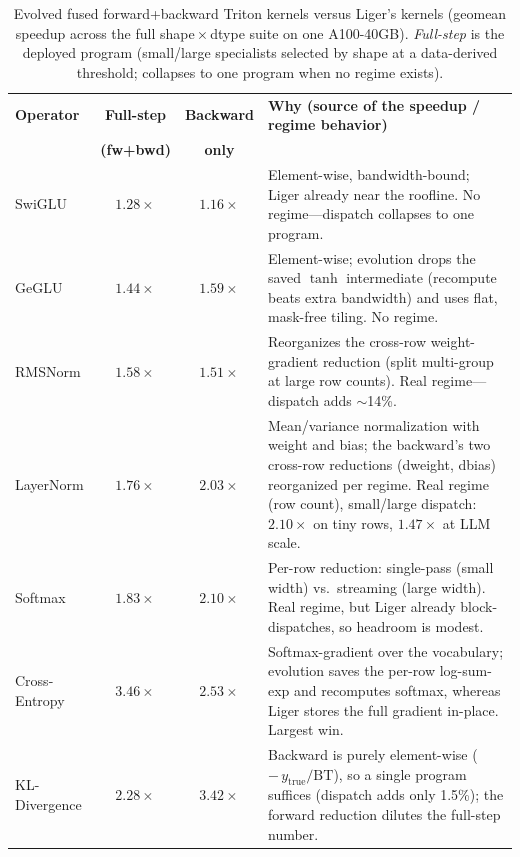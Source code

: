 \documentclass[11pt]{article}
\begin{document}
\begin{table}[t]
\centering
\caption{Evolved fused forward+backward Triton kernels versus Liger's 
kernels (geomean speedup across the full shape\,$\times$\,dtype suite on one A100-40GB).
\emph{Full-step} is the deployed program (small/large specialists selected by shape at a
data-derived threshold; collapses to one program when no regime exists).}
\label{tab:liger-comparison}
\renewcommand{\arraystretch}{1.25}
\begin{tabular}{@{}l c c >{\raggedright\arraybackslash}p{8.0cm}@{}}
\toprule
\textbf{Operator} & \textbf{Full-step} & \textbf{Backward} & \textbf{Why (source of the speedup / regime behavior)} \\
 & \textbf{(fw+bwd)} & \textbf{only} & \\
\midrule
SwiGLU & $1.28\times$ & $1.16\times$ & Element-wise, bandwidth-bound; Liger already near the roofline. No regime---dispatch collapses to one program. \\
GeGLU & $1.44\times$ & $1.59\times$ & Element-wise; evolution drops the saved $\tanh$ intermediate (recompute beats extra bandwidth) and uses flat, mask-free tiling. No regime. \\
RMSNorm & $1.58\times$ & $1.51\times$ & Reorganizes the cross-row weight-gradient reduction (split multi-group at large row counts). Real regime---dispatch adds $\sim$14\%. \\
LayerNorm & $1.76\times$ & $2.03\times$ & Mean/variance normalization with weight and bias; the backward's two cross-row reductions (dweight, dbias) reorganized per regime. Real regime (row count), small/large dispatch: $2.10\times$ on tiny rows, $1.47\times$ at LLM scale. \\

Softmax & $1.83\times$ & $2.10\times$ & Per-row reduction: single-pass (small width) vs.\ streaming (large width). Real regime, but Liger already block-dispatches, so headroom is modest. \\
Cross-Entropy & $3.46\times$ & $2.53\times$ & Softmax-gradient over the vocabulary; evolution saves the per-row log-sum-exp and recomputes softmax, whereas Liger stores the full gradient in-place. Largest win. \\
KL-Divergence & $2.28\times$ & $3.42\times$ & Backward is purely element-wise ($-\,y_{\text{true}}/\mathrm{BT}$), so a single program suffices (dispatch adds only 1.5\%); the forward reduction dilutes the full-step number. \\
\bottomrule
\end{tabular}
\end{table}
\end{document}
